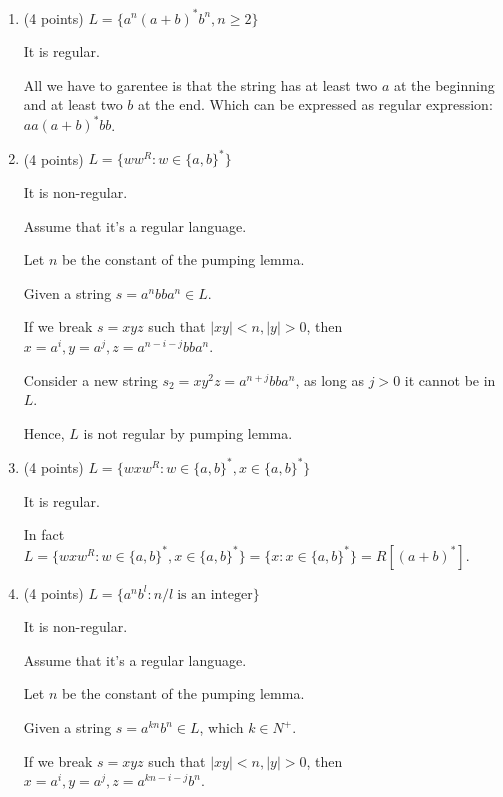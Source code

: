 \documentclass[paper=a4, fontsize=11pt]{scrartcl} %
\begin{document}
\begin{enumerate}
\item
  \begin{fancyquotes}
    (4 points) $L = \{a^n(a+b)^*b^n, n\geq 2\}$
  \end{fancyquotes}

  It is regular.

  All we have to garentee is that the string has at least two $a$ at
  the beginning and at least two $b$ at the end.
  Which can be expressed as regular expression: $aa(a+b)^*bb$.

\item
  \begin{fancyquotes}
    (4 points) $L = \{ww^R : w\in\{a,b\}^*\}$
  \end{fancyquotes}

  It is non-regular.

  Assume that it's a regular language.

  Let $n$ be the constant of the pumping lemma.

  Given a string $s = a^nbba^n \in L$.

  If we break $s = xyz$ such that $|xy|<n, |y|>0$, then
  $x = a^i, y = a^j, z = a^{n-i-j}bba^n$.

  Consider a new string $s_2 = xy^2z = a^{n+j}bba^n$,
  as long as $j>0$ it cannot be in $L$.

  Hence, $L$ is not regular by pumping lemma.

\item
  \begin{fancyquotes}
    (4 points) $L = \{wxw^R : w\in\{a,b\}^*, x\in\{a,b\}^*\}$
  \end{fancyquotes}


  It is regular.

  In fact $L = \{wxw^R : w\in\{a,b\}^*, x\in\{a,b\}^*\} = \{x :
  x\in\{a,b\}^*\} = R[(a+b)^*]$.

\item
  \begin{fancyquotes}
    (4 points) $L = \{a^{n}b^l : n/l\;\text{is an integer}\}$
  \end{fancyquotes}

  It is non-regular.

  Assume that it's a regular language.

  Let $n$ be the constant of the pumping lemma.

  Given a string $s = a^{kn}b^n \in L$, which $k\in N^+$.

  If we break $s = xyz$ such that $|xy|<n, |y|>0$, then
  $x = a^i, y = a^j, z = a^{kn-i-j}b^n$.


\end{enumerate}
\end{document}
